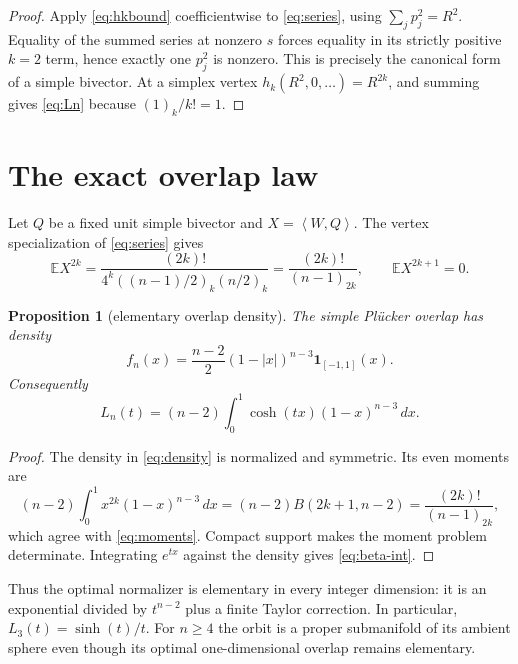 \documentclass[11pt,a4paper]{article}
\newtheorem{proposition}[theorem]{Proposition}
\newcommand{\E}{\mathbb E}
\newcommand{\ip}[2]{\left\langle #1,#2\right\rangle}
\begin{document}
\begin{proof}
Apply \cref{eq:hkbound} coefficientwise to \cref{eq:series}, using $\sum_jp_j^2=R^2$.  Equality of the summed series at nonzero $s$ forces equality in its strictly positive $k=2$ term, hence exactly one $p_j^2$ is nonzero.  This is precisely the canonical form of a simple bivector.  At a simplex vertex $h_k(R^2,0,\ldots)=R^{2k}$, and summing gives \cref{eq:Ln} because $(1)_k/k!=1$.
\end{proof}

\section{The exact overlap law}

Let $Q$ be a fixed unit simple bivector and $X=\ip WQ$.  The vertex specialization of \cref{eq:series} gives
\begin{equation}\label{eq:moments}
 \E X^{2k}=\frac{(2k)!}{4^k((n-1)/2)_k(n/2)_k}
 =\frac{(2k)!}{(n-1)_{2k}},
 \qquad \E X^{2k+1}=0.
\end{equation}

\begin{proposition}[elementary overlap density]\label{prop:density}
The simple Pl\"ucker overlap has density
\begin{equation}\label{eq:density}
 \boxed{f_n(x)=\frac{n-2}{2}(1-|x|)^{n-3}\mathbf1_{[-1,1]}(x).}
\end{equation}
Consequently
\begin{equation}\label{eq:beta-int}
 L_n(t)=(n-2)\int_0^1\cosh(tx)(1-x)^{n-3}\,dx.
\end{equation}
\end{proposition}

\begin{proof}
The density in \cref{eq:density} is normalized and symmetric.  Its even moments are
\[
 (n-2)\int_0^1x^{2k}(1-x)^{n-3}\,dx
 =(n-2)B(2k+1,n-2)=\frac{(2k)!}{(n-1)_{2k}},
\]
which agree with \cref{eq:moments}.  Compact support makes the moment problem determinate.  Integrating $e^{tx}$ against the density gives \cref{eq:beta-int}.
\end{proof}

Thus the optimal normalizer is elementary in every integer dimension: it is an exponential divided by $t^{n-2}$ plus a finite Taylor correction.  In particular, $L_3(t)=\sinh(t)/t$.  For $n\ge4$ the orbit is a proper submanifold of its ambient sphere even though its optimal one-dimensional overlap remains elementary.
\end{document}
